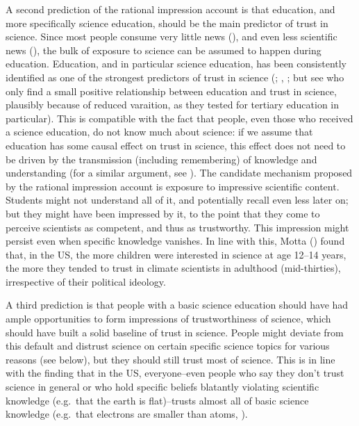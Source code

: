 \documentclass[
  jou,
  floatsintext,
  longtable,
  nolmodern,
  notxfonts,
  notimes,
  colorlinks=true,linkcolor=blue,citecolor=blue,urlcolor=blue]{apa7}
\begin{document}
A second prediction of the rational impression account is that
education, and more specifically science education, should be the main
predictor of trust in science. Since most people consume very little
news (),
and even less scientific news
(), the
bulk of exposure to science can be assumed to happen during education.
Education, and in particular science education, has been consistently
identified as one of the strongest predictors of trust in science
(;
,
; but
see 
who only find a small positive relationship between education and trust
in science, plausibly because of reduced varaition, as they tested for
tertiary education in particular). This is compatible with the fact that
people, even those who received a science education, do not know much
about science: if we assume that education has some causal effect on
trust in science, this effect does not need to be driven by the
transmission (including remembering) of knowledge and understanding (for
a similar argument, see
). The
candidate mechanism proposed by the rational impression account is
exposure to impressive scientific content. Students might not understand
all of it, and potentially recall even less later on; but they might
have been impressed by it, to the point that they come to perceive
scientists as competent, and thus as trustworthy. This impression might
persist even when specific knowledge vanishes. In line with this, Motta
() found that, in
the US, the more children were interested in science at age 12--14
years, the more they tended to trust in climate scientists in adulthood
(mid-thirties), irrespective of their political ideology.

A third prediction is that people with a basic science education should
have had ample opportunities to form impressions of trustworthiness of
science, which should have built a solid baseline of trust in science.
People might deviate from this default and distrust science on certain
specific science topics for various reasons (see below), but they should
still trust most of science. This is in line with the finding that in
the US, everyone--even people who say they don't trust science in
general or who hold specific beliefs blatantly violating scientific
knowledge (e.g.~that the earth is flat)--trusts almost all of basic
science knowledge (e.g.~that electrons are smaller than atoms,
).
\end{document}
